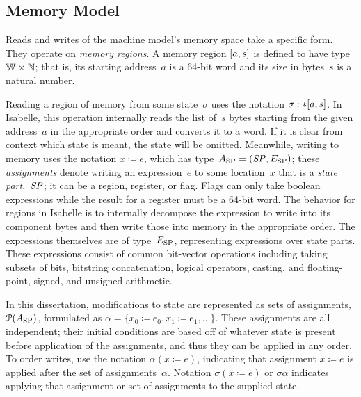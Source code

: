 \subsection{Memory Model}
Reads and writes of the machine model's memory space take a specific form.
They operate on \emph{memory regions}.%
A memory region $[a,s]$ is defined to have type $\mathbb W\times\mathbb N$;%
%
that is, its starting address~$a$ is a 64-bit word
and its size in bytes~$s$ is a natural number.

Reading a region of memory from some state~$\sigma$
uses the notation $\sigma:\ast[a,s]$.
In Isabelle, this operation internally reads the list of~$s$ bytes
starting from the given address~$a$ in the appropriate order
and converts it to a word.
If it is clear from context which state is meant, the state will be omitted.
Meanwhile, writing to memory uses the notation $x\coloneqq e$,%
which has type~$A_\mathrm{SP}=(\mathit{SP},E_\mathrm{SP})$;
these \emph{assignments} denote writing an expression~$e$ to some location~$x$
that is a \emph{state part},~$\mathit{SP}$;%
%
it can be a region, register, or flag.%
%
%
Flags can only take boolean expressions while
the result for a register must be a 64-bit word.
The behavior for regions in Isabelle
is to internally decompose the expression to write
into its component bytes and then write those into memory in the appropriate order.
The expressions themselves are of type~$E_\mathrm{SP}$,%
representing expressions over state parts.
These expressions consist of common bit-vector
operations including
taking subsets of bits, bitstring concatenation, logical operators, casting,
and floating-point, signed, and unsigned arithmetic.

In this dissertation,
modifications to state are represented as sets of assignments,~$\operatorname{\mathcal P}(A_\mathrm{SP})$,
formulated as $\alpha=\{x_0\coloneqq e_0,x_1\coloneqq e_1,\dotsc\}$.
These assignments are all independent; their initial conditions
are based off of whatever state is present before application of the assignments,
and thus they can be applied in any order.
To order writes, use the notation $\alpha(x\coloneqq e)$,
indicating that assignment $x\coloneqq e$ is applied
after the set of assignments~$\alpha$.
Notation $\sigma(x\coloneqq e)$ or $\sigma\alpha$ indicates applying that assignment
or set of assignments to the supplied state.

